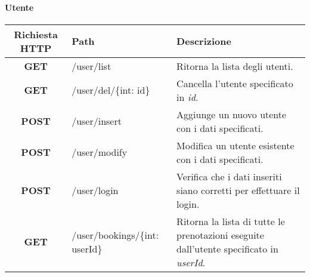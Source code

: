 \paragraph{Utente}
\begin{center}
	\begin{longtable}{|c|p{7cm}|p{5cm}|}
		\hline
		\rowcolor{lighter-grayer}
		\textbf{Richiesta HTTP} & \textbf{Path} & \textbf{Descrizione}\\		
		\hline
		\endfirsthead
		\textbf{GET} & /user/list & Ritorna la lista degli utenti.\\
		\hline
		\textbf{GET} & /user/del/\{int: id\} & Cancella l'utente specificato in \textit{id}.\\
		\hline
		\textbf{POST} & /user/insert & Aggiunge un nuovo utente con i dati specificati.\\
		\hline
		\textbf{POST} & /user/modify & Modifica un utente esistente con i dati specificati.\\
		\hline
		\textbf{POST} & /user/login & Verifica che i dati inseriti siano corretti per effettuare il login.\\
		\hline
		\textbf{GET} & /user/bookings/\{int: userId\} & Ritorna la lista di tutte le prenotazioni eseguite dall'utente specificato in \textit{userId}.\\
		\hline
	\end{longtable}
\end{center}
